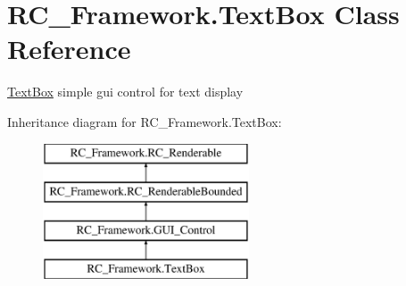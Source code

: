 \hypertarget{class_r_c___framework_1_1_text_box}{}\section{R\+C\+\_\+\+Framework.\+Text\+Box Class Reference}
\label{class_r_c___framework_1_1_text_box}


\mbox{\hyperlink{class_r_c___framework_1_1_text_box}{Text\+Box}} simple gui control for text display  


Inheritance diagram for R\+C\+\_\+\+Framework.\+Text\+Box\+:\begin{figure}[H]
\begin{center}
\leavevmode
\includegraphics[height=4.000000cm]{class_r_c___framework_1_1_text_box}
\end{center}
\end{figure}
